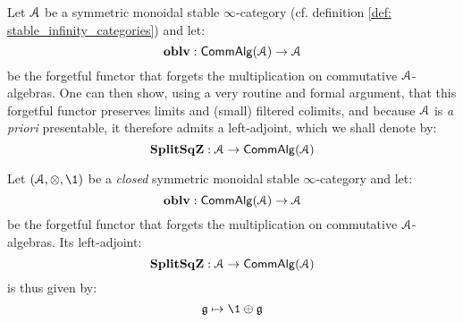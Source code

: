                 \begin{definition} \label{def: the_square_zero_extension_functor_existence}
                    Let $\mathcal{A}$ be a symmetric monoidal stable $\infty$-category (cf. definition \ref{def: stable_infinity_categories}) and let:
                        $$\mathbf{oblv}: \mathsf{Comm}\mathsf{Alg}(\mathcal{A}) \to \mathcal{A}$$
                    be the forgetful functor that forgets the multiplication on commutative $\mathcal{A}$-algebras. One can then show, using a very routine and formal argument, that this forgetful functor preserves limits and (small) filtered colimits, and because $\mathcal{A}$ is \textit{a priori} presentable, it therefore admits a left-adjoint, which we shall denote by:
                        $$\mathbf{Split}\mathbf{Sq}\mathbf{Z}: \mathcal{A} \to \mathsf{Comm}\mathsf{Alg}(\mathcal{A})$$
                \end{definition}
                \begin{proposition} \label{prop: the_square_zero_extension_functor_explicit_description}
                    Let $(\calA, \tensor, \1)$ be a \textit{closed} symmetric monoidal stable $\infty$-category and let:
                        $$\mathbf{oblv}: \mathsf{Comm}\mathsf{Alg}(\mathcal{A}) \to \mathcal{A}$$
                    be the forgetful functor that forgets the multiplication on commutative $\mathcal{A}$-algebras. Its left-adjoint:
                        $$\mathbf{Split}\mathbf{Sq}\mathbf{Z}: \mathcal{A} \to \mathsf{Comm}\mathsf{Alg}(\mathcal{A})$$
                    is thus given by:
                        $$\g \mapsto \1 \oplus \g$$
                \end{proposition}
